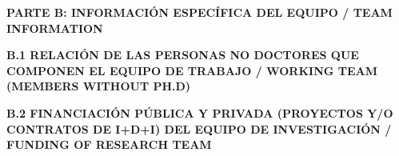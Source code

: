 \documentclass[a4paper,11pt,oneside]{article}
\begin{document}

\newpage
\setcounter{page}{1}


\begin{tcolorbox}[colback=yellow,arc=0pt,outer arc=0pt,colframe=black,boxrule=0.6pt,left=0mm]
  \noindent\textbf{PARTE B: INFORMACIÓN ESPECÍFICA DEL EQUIPO / TEAM INFORMATION}
\end{tcolorbox}

\vspace{12pt}
\noindent\textbf{B.1 RELACIÓN DE LAS PERSONAS NO DOCTORES QUE COMPONEN EL EQUIPO DE TRABAJO / WORKING TEAM (MEMBERS WITHOUT PH.D) }




\noindent\textbf{B.2 FINANCIACIÓN PÚBLICA Y PRIVADA (PROYECTOS Y/O CONTRATOS DE I+D+I) DEL EQUIPO DE INVESTIGACIÓN / FUNDING OF RESEARCH TEAM}
\vspace{12pt}



\newpage
\setcounter{page}{1}


\end{document}
